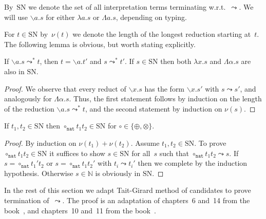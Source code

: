 \documentclass[a4paper,UKenglish,cleveref,autoref,numberwithinsect]{lipics-v2019}
\theoremstyle{definition}
\newcommand{\abstraction}[2]{\backslash #1.#2}
\newcommand{\abs}[2]{\lambda #1.#2}
\newcommand{\tabs}[2]{\Lambda #1.#2}
\newcommand{\arrW}{\leadsto}
\newcommand{\nat}{\mathtt{nat}}
\newcommand{\SN}{\mathrm{SN}}
\begin{document}
By~$\SN$ we denote the set of all interpretation terms terminating
w.r.t.~$\arrW$. We will use $\abstraction{a}{s}$ for either
$\abs{a}{s}$ or $\tabs{a}{s}$, depending on typing.

For $t \in \SN$ by~$\nu(t)$ we denote the length of the longest
reduction starting at~$t$. The following lemma is obvious, but worth
stating explicitly.

\begin{lemma}\label{lem_reduce_abs}
  If $\abstraction{a}{s} \arrW^* t$, then $t = \abstraction{a}{t'}$
  and $s \arrW^* t'$.  If $s \in \SN$ then both $\abs{x}{s}$ and
  $\tabs{\alpha}{s}$ are also in $\SN$.
\end{lemma}

\begin{proof}
  We observe that every reduct of $\abstraction{x}{s}$ has the form
  $\abstraction{x}{s'}$ with $s \arrW s'$, and analogously for
  $\tabs{\alpha}{s}$.  Thus, the first statement follows by induction
  on the length of the reduction $\abstraction{a}{s} \arrW^* t$,
  and the second statement by induction on $\nu(s)$.
\end{proof}

\begin{lemma}\label{lem_circ_sn_base}
  If $t_1,t_2 \in \SN$ then $\circ_\nat t_1 t_2 \in \SN$ for $\circ
  \in \{\oplus,\otimes\}$.
\end{lemma}

\begin{proof}
  By induction on $\nu(t_1) + \nu(t_2)$. Assume $t_1,t_2 \in \SN$. To
  prove $\circ_\nat t_1 t_2 \in \SN$ it suffices to show $s \in \SN$
  for all~$s$ such that $\circ_\nat t_1 t_2 \arrW s$. If $s =
  \circ_\nat t_1' t_2$ or $s = \circ_\nat t_1 t_2'$ with $t_i \arrW
  t_i'$ then we complete by the induction hypothesis. Otherwise $s \in
  \mathbb{N}$ is obviously in $\SN$.
\end{proof}

In the rest of this section we adapt Tait-Girard method of candidates
to prove termination of~$\arrW$. The proof is an adaptation of
chapters~6 and~14 from the book~\cite{Girard1989}, and chapters~10
and~11 from the book~\cite{SorensenUrzyczyn2006}.
\end{document}
